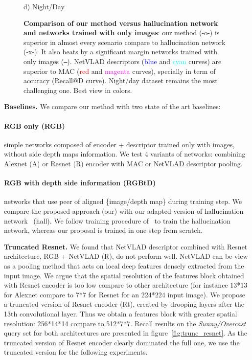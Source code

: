 \begin{figure}
\begin{minipage}{0.85\linewidth}
\begin{minipage}{0.49\linewidth}
		{\scriptsize d) Night/Day}
	\end{minipage}
	
	\end{minipage}

	\caption{\label{fig:results} \textbf{Comparison of our method versus hallucination network and networks trained with only images}: our method (-o-) is superior in almost every scenario compare to hallucination network (-x-). It also beats by a significant margin networks trained with only images (\texttt{--}). NetVLAD descriptors (\textcolor{blue}{blue} and \textcolor{cyan}{cyan} curves) are superior to MAC (\textcolor{red}{red} and \textcolor{magenta}{magenta} curves), specially in term of accuracy (Recall@D curve). Night/day dataset remains the most challenging one.  Best view in colors.}
\end{figure}

\noindent\textbf{Baselines.} We compare our method with two state of the art baselines:
    \paragraph{RGB only (RGB)} simple networks composed of encoder + descriptor trained only with images, without side depth maps information. We test 4 variants of networks: combining Alexnet (A) or Resnet (R) encoder with MAC or NetVLAD descriptor pooling.
    \paragraph{RGB with depth side information (RGBtD)} networks that use peer of aligned \{image/depth map\} during training step. We compare the proposed approach (our) with our adapted version of hallucination network~\cite{Hoffman2016} (hall). We follow training procedure of~\cite{Hoffman2016} to train the hallucination network, whereas our proposal is trained in one step from scratch. 

\noindent\textbf{Truncated Resnet.} We found that NetVLAD descriptor combined with Resnet architecture, RGB + NetVLAD (R), do not perform well. NetVLAD can be view as a pooling method that acts on local deep features densely extracted from the input image. We argue that the spatial resolution of the features block obtained with Resnet encoder is too low compare to other architecture (for instance 13*13 for Alexnet compare to 7*7 for Resnet for an 224*224 input image). We propose a truncated version of Resnet encoder (Rt), created by drooping layers after the 13th convolutional layer. Thus we obtain a features block with greater spatial resolution: 256*14*14 compare to 512*7*7. Recall results on the \textit{Sunny/Overcast} query set for both architectures are presented in figure~\ref{fig:trunc_resnet}. As the truncated version of Resnet encoder clearly dominated the full one, we use the truncated version for the following experiments.

